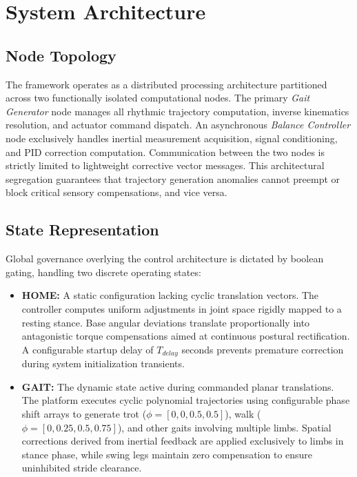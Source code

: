 \section{System Architecture}

\subsection{Node Topology}

The framework operates as a distributed processing architecture
partitioned across two functionally isolated computational nodes.
The primary \textit{Gait Generator} node manages all rhythmic
trajectory computation, inverse kinematics resolution, and
actuator command dispatch. An asynchronous \textit{Balance
Controller} node exclusively handles inertial measurement
acquisition, signal conditioning, and PID correction computation.
Communication between the two nodes is strictly limited to
lightweight corrective vector messages. This architectural
segregation guarantees that trajectory generation anomalies
cannot preempt or block critical sensory compensations, and
vice versa.

\subsection{State Representation}

Global governance overlying the control architecture is dictated
by boolean gating, handling two discrete operating states:

\begin{itemize}
    \item \textbf{HOME:} A static configuration lacking cyclic
    translation vectors. The controller computes uniform
    adjustments in joint space rigidly mapped to a resting stance.
    Base angular deviations translate proportionally into
    antagonistic torque compensations aimed at continuous postural
    rectification. A configurable startup delay of $T_{delay}$
    seconds prevents premature correction during system
    initialization transients.

    \item \textbf{GAIT:} The dynamic state active during commanded
    planar translations. The platform executes cyclic polynomial
    trajectories using configurable phase shift arrays to generate
    trot ($\phi = [0, 0, 0.5, 0.5]$), walk ($\phi = [0, 0.25,
    0.5, 0.75]$), and other gaits involving multiple limbs.
    Spatial corrections derived from inertial feedback are applied
    exclusively to limbs in stance phase, while swing legs maintain
    zero compensation to ensure uninhibited stride clearance.
\end{itemize}
